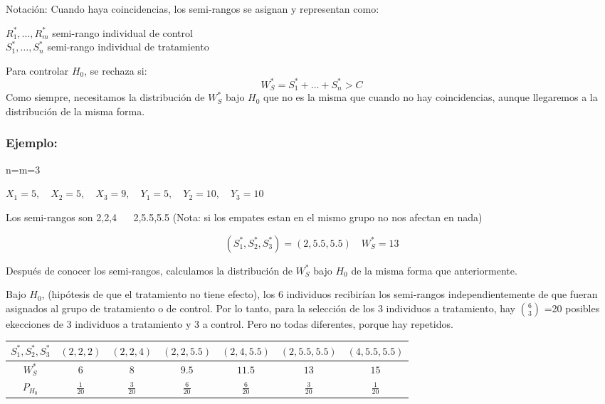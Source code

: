 Notación:
 Cuando haya coincidencias, los semi-rangos se asignan y representan como:
 \begin{center}
    $R_1^*,\dots,R_m^*$ semi-rango individual de control \\
    $S_1^*,\dots,S_n^*$ semi-rango individual de tratamiento
 \end{center}

 Para controlar $H_0$, se rechaza si:
 \[
 W_S^*=S_1^*+\dots+S_n^*>C
 \]
Como siempre, necesitamos la distribución de $W_S^*$ bajo $H_0$ que no es la misma que cuando no hay coincidencias, aunque llegaremos a la distribución de la misma forma.
\newpage

\subsubsection*{Ejemplo:}
n=m=3

\(
X_1=5, \quad X_2=5, \quad X_3=9, \quad Y_1=5,\quad Y_2=10,\quad Y_3=10
\)

Los semi-rangos son 2,2,4 $\quad$ 2,5.5,5.5
(Nota: si los empates estan en el mismo grupo no nos afectan en nada)

\[
(S_1^*,S_2^*,S_3^*)=(2,5.5,5.5) \quad W_S^*=13
\]

Después de conocer los semi-rangos, calculamos la distribución de $W_S^*$ bajo $H_0$ de la misma forma que anteriormente.

Bajo $H_0$, (hipótesis de que el tratamiento no tiene efecto), los 6 individuos recibirían los semi-rangos independientemente de que fueran asignados al grupo de tratamiento o de control. Por lo tanto, para la selección de los 3 individuos a tratamiento, hay $\binom{6}{3}$
=20 posibles ekecciones de 3 individuos a tratamiento y 3 a control. Pero no todas diferentes, porque hay repetidos.

\begin{table}[h!]
    \centering
    \begin{tabular}{c|c|c|c|c|c|c}
    $S_1^*,S_2^*,S_3^*$ & $(2,2,2)$ & $(2,2,4)$ & $(2,2,5.5)$ & $(2,4,5.5)$ & $(2,5.5,5.5)$ & $(4,5.5,5.5)$ \\ \hline
    $W_S^*$             & $6$       & $8$       & $9.5$       & $11.5$      & $13$          & $15$          \\ \hline
    $P_{H_0}$           & $\frac{1}{20}$ & $\frac{3}{20}$ & $\frac{6}{20}$ & $\frac{6}{20}$ & $\frac{3}{20}$ & $\frac{1}{20}$
    \end{tabular}
\end{table}


